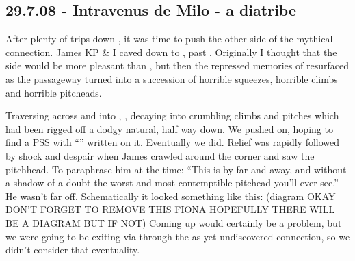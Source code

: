 \subsection{29.7.08 - Intravenus de Milo - a diatribe}


After plenty of trips down , it was time to push the other side
of the mythical - connection. James KP
\& I caved down to , past . Originally I thought that the  side
would be more pleasant than , but then the repressed memories
of  resurfaced as the passageway turned into a
succession of horrible squeezes, horrible climbs and horrible pitcheads.



Traversing across  and into , , decaying into crumbling climbs and pitches
which had been rigged off a dodgy natural, half way down. We pushed on,
hoping to find a PSS with ``'' written on it.
Eventually we did. Relief was rapidly followed by shock and despair when
James crawled around the corner and saw the 
pitchhead. To paraphrase him at the time: ``This is by far and away, and
without a shadow of a doubt the worst and most contemptible pitchead
you'll ever see.'' He wasn't far off. Schematically it looked something
like this: (diagram OKAY DON'T FORGET TO REMOVE THIS FIONA HOPEFULLY THERE WILL BE A DIAGRAM BUT IF NOT) Coming up would certainly be a problem, but we were
going to be exiting via  through the as-yet-undiscovered
connection, so we didn't consider that eventuality.

